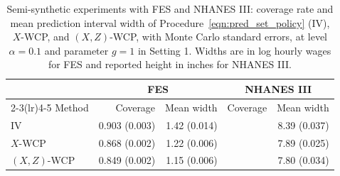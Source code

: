 \begin{table}
\centering\footnotesize
\setlength{\tabcolsep}{4pt}
\begin{tabular}{lrrrr}
\toprule
& \multicolumn{2}{c}{FES} & \multicolumn{2}{c}{NHANES III}\\
\cmidrule(lr){2-3}\cmidrule(lr){4-5}
Method & Coverage & Mean width & Coverage & Mean width \\
\midrule
IV
& \cellcolor{green!20}0.903 (0.003)
& 1.42 (0.014)
& \cellcolor{red!20}{0.870 (0.002)}
& 8.39 (0.037) \\

$X$-WCP
& \cellcolor{red!20}0.868 (0.002)
& 1.22 (0.006)
& \cellcolor{red!20}{0.847 (0.002)}
& 7.89 (0.025) \\

$(X,Z)$-WCP
& \cellcolor{red!20}0.849 (0.002)
& 1.15 (0.006)
& \cellcolor{red!20}{0.842 (0.002)}
& 7.80 (0.034) \\
\bottomrule
\end{tabular}
\caption{\footnotesize Semi-synthetic experiments with FES and NHANES III: coverage rate and mean prediction interval width of Procedure~\eqref{eqn:pred_set_policy} (IV), $X$-WCP, and $(X,Z)$-WCP, with Monte Carlo standard errors, at level $\alpha=0.1$ and parameter $g=1$ in Setting 1. Widths are in log hourly wages for FES and reported height in inches for NHANES III.}
\label{tab:empirical-masking}
\end{table}
